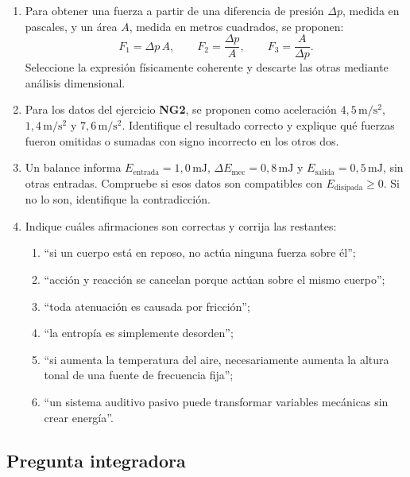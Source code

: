 \begin{enumerate}[label=\textbf{D\arabic*.},leftmargin=*]
    \item Para obtener una fuerza a partir de una diferencia de presión
    \(\Delta p\), medida en pascales, y un área \(A\), medida en metros
    cuadrados, se proponen:
    \[
        F_1=\Delta p\,A,
        \qquad
        F_2=\frac{\Delta p}{A},
        \qquad
        F_3=\frac{A}{\Delta p}.
    \]
    Seleccione la expresión físicamente coherente y descarte las otras mediante
    análisis dimensional.

    \item Para los datos del ejercicio \textbf{NG2}, se proponen como
    aceleración \(4{,}5\,\text{m}/\text{s}^{2}\),
    \(1{,}4\,\text{m}/\text{s}^{2}\) y
    \(7{,}6\,\text{m}/\text{s}^{2}\). Identifique el resultado correcto y
    explique qué fuerzas fueron omitidas o sumadas con signo incorrecto en los
    otros dos.

    \item Un balance informa
    \(E_\mathrm{entrada}=1{,}0\,\text{mJ}\),
    \(\Delta E_\mathrm{mec}=0{,}8\,\text{mJ}\) y
    \(E_\mathrm{salida}=0{,}5\,\text{mJ}\), sin otras entradas. Compruebe si
    esos datos son compatibles con
    \(E_\mathrm{disipada}\geq0\). Si no lo son, identifique la contradicción.

    \item Indique cuáles afirmaciones son correctas y corrija las restantes:
    \begin{enumerate}[label=\alph*)]
        \item ``si un cuerpo está en reposo, no actúa ninguna fuerza sobre él'';
        \item ``acción y reacción se cancelan porque actúan sobre el mismo
        cuerpo'';
        \item ``toda atenuación es causada por fricción'';
        \item ``la entropía es simplemente desorden'';
        \item ``si aumenta la temperatura del aire, necesariamente aumenta la
        altura tonal de una fuente de frecuencia fija'';
        \item ``un sistema auditivo pasivo puede transformar variables
        mecánicas sin crear energía''.
    \end{enumerate}
\end{enumerate}

\subsection*{Pregunta integradora}


